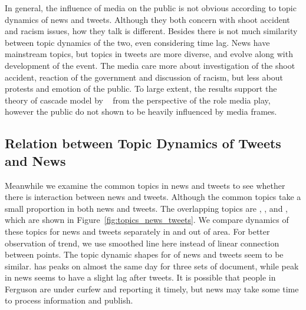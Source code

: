 In general, the influence of media on the public is not obvious according to topic dynamics of news and tweets. Although they both concern with shoot accident and racism issues, how they talk is different. Besides there is not much similarity between topic dynamics of the two, even considering time lag. News have mainstream topics, but topics in tweets are more diverse, and evolve along with development of the event. The media care more about investigation of the shoot accident, reaction of the government and discussion of racism, but less about protests and emotion of the public. To large extent, the results support the theory of cascade model by ~ from the perspective of the role media play, however the public do not shown to be heavily influenced by media frames.

\subsection{Relation between Topic Dynamics of Tweets and News}
Meanwhile we examine the common topics in news and tweets to see whether there is interaction between news and tweets. Although the common topics take a small proportion in both news and tweets. The overlapping topics are \protest, \curfew, \michaelbrown and \newsreport, which are shown in Figure~\ref{fig:topics_news_tweets}. We compare dynamics of these topics for news and tweets separately in and out of \stlouis area. For better observation of trend, we use smoothed line here instead of linear connection between points. The topic dynamic shapes for \protest of news and tweets seem to be similar. \protest has peaks on almost the same day for three sets of document, while \curfew peak in news seems to have a slight lag after tweets. It is possible that people in Ferguson are under curfew and reporting it timely, but news may take some time to process information and publish.

